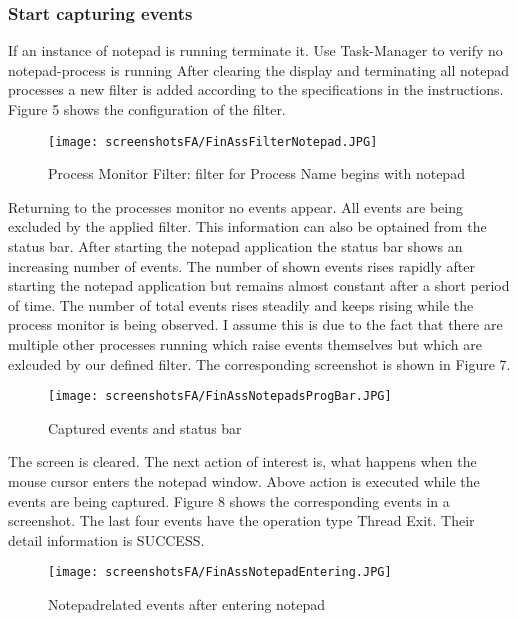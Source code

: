 \documentclass{Gharaei}
\begin{document}
\subsubsection{Start capturing events}
If an instance of notepad is running terminate it. Use Task-Manager to verify no notepad-process is running
After clearing the display and terminating all notepad processes a new filter is added according to the specifications in the instructions. Figure 5 shows the configuration of the filter. 

\begin{figure}[H]
    \centering
    \texttt{[image: screenshotsFA/FinAssFilterNotepad.JPG]}
\caption{Process Monitor Filter: filter for Process Name begins with notepad}
\end{figure}
Returning to the processes monitor no events appear. All events are being excluded by the applied filter. This information can also be optained from the status bar. 
After starting the notepad application the status bar shows an increasing number of events. The number of shown events rises rapidly after starting the notepad application but remains almost constant after a short period of time. The number of total events rises steadily and keeps rising while the process monitor is being observed. I assume this is due to the fact that there are multiple other processes running which raise events themselves but which are exlcuded by our defined filter. The corresponding screenshot is shown in Figure 7.
\begin{figure}[H]
    \centering
    \texttt{[image: screenshotsFA/FinAssNotepadsProgBar.JPG]}
\caption{Captured events and status bar}
\end{figure}
The screen is cleared.
The next action of interest is, what happens when the mouse cursor enters the notepad window.
Above action is executed while the events are being captured. Figure 8 shows the corresponding events in a screenshot. The last four events have the operation type Thread Exit. Their detail information is SUCCESS.  %

\begin{figure}[H]
    \centering
\texttt{[image: screenshotsFA/FinAssNotepadEntering.JPG]}
\caption{Notepadrelated events after entering notepad}
\end{figure}
\end{document}
